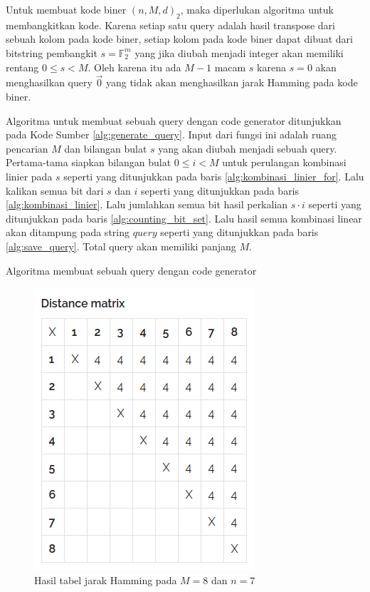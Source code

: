 Untuk membuat kode biner $(n,M,d)_2$, maka diperlukan algoritma untuk membangkitkan kode. Karena setiap satu query adalah hasil transpose dari sebuah kolom pada kode biner, setiap kolom pada kode biner dapat dibuat dari bitstring pembangkit $s = \mathbb{F}_2^m$ yang jika diubah menjadi integer akan memiliki rentang $0 \leq s < M$. Oleh karena itu ada $M-1$ macam $s$ karena $s=0$ akan menghasilkan query $\vec{0}$ yang tidak akan menghasilkan jarak Hamming pada kode biner.

Algoritma untuk membuat sebuah query dengan code generator ditunjukkan pada Kode Sumber \ref{alg:generate_query}. Input dari fungsi ini adalah ruang pencarian $M$ dan bilangan bulat $s$ yang akan diubah menjadi sebuah query. Pertama-tama siapkan bilangan bulat $0 \leq i < M$ untuk perulangan kombinasi linier pada $s$ seperti yang ditunjukkan pada baris \ref{alg:kombinasi_linier_for}. Lalu kalikan semua bit dari $s$ dan $i$ seperti yang ditunjukkan pada baris \ref{alg:kombinasi_linier}. Lalu jumlahkan semua bit hasil perkalian $s \cdot i$ seperti yang ditunjukkan pada baris \ref{alg:counting_bit_set}. Lalu hasil semua kombinasi linear akan ditampung pada string $query$ seperti yang ditunjukkan pada baris \ref{alg:save_query}. Total query akan memiliki panjang $M$.

\begin{algorithm}[h]
\caption{Algoritma membuat sebuah query dengan code generator}
\label{alg:generate_query}
\end{algorithm}

\begin{figure}
\centering
\includegraphics[scale=0.5]{../img/perfect8.png}
\caption{Hasil tabel jarak Hamming pada $M=8$ dan $n=7$}
\label{fig:perfect8}
\end{figure}

